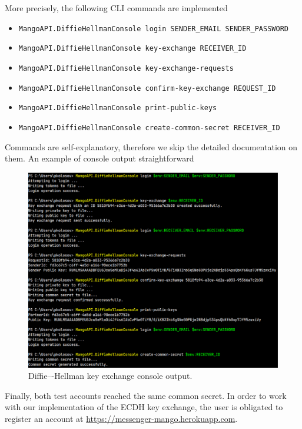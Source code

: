 More precisely, the following CLI commands are implemented
\begin{itemize}
    \item \texttt{MangoAPI.DiffieHellmanConsole login SENDER\_EMAIL SENDER\_PASSWORD}
    \item \texttt{MangoAPI.DiffieHellmanConsole key-exchange RECEIVER\_ID}
    \item \texttt{MangoAPI.DiffieHellmanConsole key-exchange-requests}
    \item \texttt{MangoAPI.DiffieHellmanConsole confirm-key-exchange REQUEST\_ID}
    \item \texttt{MangoAPI.DiffieHellmanConsole print-public-keys}
    \item \texttt{MangoAPI.DiffieHellmanConsole create-common-secret RECEIVER\_ID}
\end{itemize}
Commands are self-explanatory, therefore we skip the detailed documentation on them.
An example of console output straightforward
\begin{figure}[H]
    \centering
    \includegraphics[width=1\textwidth]{Pictures/08_Diffie-Hellman_console_output}
    \caption{Diffie–-Hellman key exchange console output.}\label{fig:figure7}
\end{figure}
Finally, both test accounts reached the same common secret.
In order to work with our implementation of the ECDH key exchange, the user is obligated to register an account
at \href{https://messenger-mango.herokuapp.com}{https://messenger-mango.herokuapp.com}.